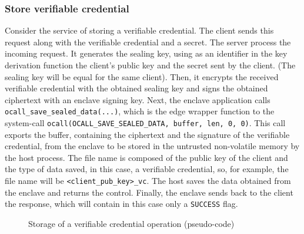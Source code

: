\subsubsection{Store verifiable credential}
Consider the service of storing a verifiable credential. The client sends this request along with the verifiable credential and a secret. The server process the incoming request. It generates the sealing key, using as an identifier in the key derivation function the client's public key and the secret sent by the client. (The sealing key will be equal for the same client). Then, it encrypts the received verifiable credential with the obtained sealing key and signs the obtained ciphertext with an enclave signing key. Next, the enclave application calls \texttt{ocall\_save\_sealed\_data(...)}, which is the edge wrapper function to the system-call \texttt{ocall(OCALL\_SAVE\_SEALED\_DATA, buffer, len, 0, 0)}. This call exports the buffer, containing the ciphertext and the signature of the verifiable credential, from the enclave to be stored in the untrusted non-volatile memory by the host process. The file name is composed of the public key of the client and the type of data saved, in this case, a verifiable credential, so, for example, the file name will be \texttt{<client\_pub\_key>\_vc}. The host saves the data obtained from the enclave and returns the control. 
Finally, the enclave sends back to the client the response, which will contain in this case only a \texttt{SUCCESS} flag. 

\begin{figure}[!h]
    \centering
    
    \caption{Storage of a verifiable credential operation (pseudo-code)}
    \label{poc-store-vc}
\end{figure}

